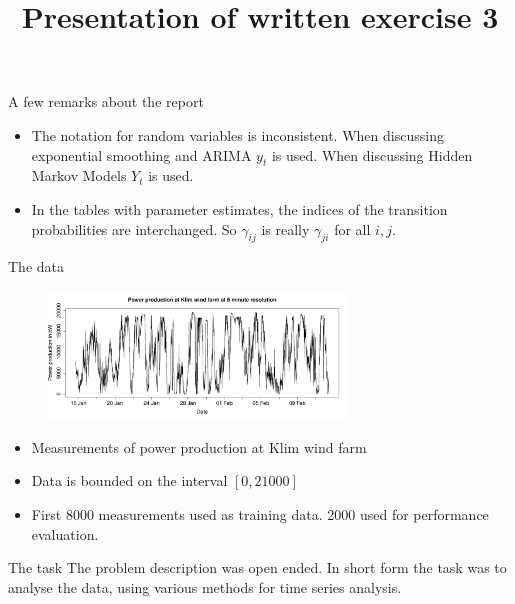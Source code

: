 

\title[Presentation of exercise 3]{Presentation of written exercise 3}


\begin{frame}
\titlepage
\end{frame}

\begin{frame}{A few remarks about the report}
    \begin{itemize}
        \item The notation for random variables is inconsistent. When discussing exponential smoothing and ARIMA $y_t$ is used. When discussing Hidden Markov Models $Y_t$ is used.
        \item In the tables with parameter estimates, the indices of the transition probabilities are interchanged. So $\gamma_{ij}$ is really $\gamma_{ji}$ for all $i,j$.
    \end{itemize}
\end{frame}

\begin{frame}{The data}
    \begin{figure}
    \includegraphics[width=300px]{../plots/training-dataset.pdf}
    \end{figure}
    \begin{itemize}
        \item Measurements of power production at Klim wind farm
        \item Data is bounded on the interval $[0, 21000]$
        \item First 8000 measurements used as training data. 2000 used for performance evaluation.
    \end{itemize}
\end{frame}

\begin{frame}{The task}
    The problem description was open ended. In short form the task was to analyse the data, using various methods for time series analysis.
\end{frame}

